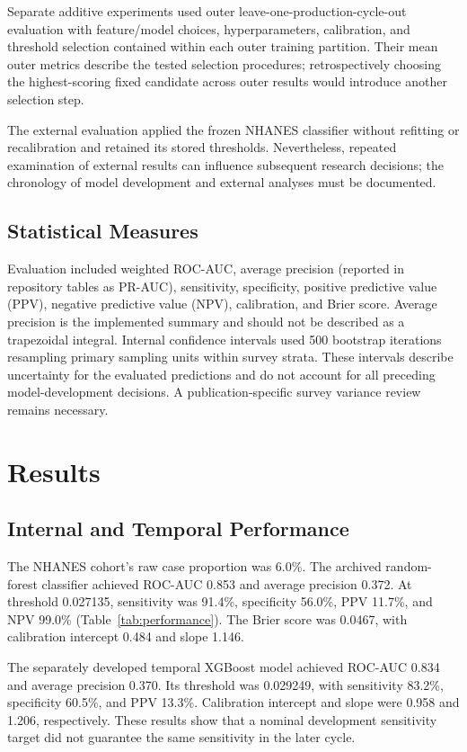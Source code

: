 \documentclass[11pt,a4paper]{article}
\begin{document}
Separate additive experiments used outer leave-one-production-cycle-out evaluation with feature/model choices, hyperparameters, calibration, and threshold selection contained within each outer training partition. Their mean outer metrics describe the tested selection procedures; retrospectively choosing the highest-scoring fixed candidate across outer results would introduce another selection step.

The external evaluation applied the frozen NHANES classifier without refitting or recalibration and retained its stored thresholds. Nevertheless, repeated examination of external results can influence subsequent research decisions; the chronology of model development and external analyses must be documented.

\subsection{Statistical Measures}
Evaluation included weighted ROC-AUC, average precision (reported in repository tables as PR-AUC), sensitivity, specificity, positive predictive value (PPV), negative predictive value (NPV), calibration, and Brier score. Average precision is the implemented summary and should not be described as a trapezoidal integral. Internal confidence intervals used 500 bootstrap iterations resampling primary sampling units within survey strata. These intervals describe uncertainty for the evaluated predictions and do not account for all preceding model-development decisions. A publication-specific survey variance review remains necessary.

\section{Results}
\subsection{Internal and Temporal Performance}
The NHANES cohort's raw case proportion was 6.0\%. The archived random-forest classifier achieved ROC-AUC 0.853 and average precision 0.372. At threshold 0.027135, sensitivity was 91.4\%, specificity 56.0\%, PPV 11.7\%, and NPV 99.0\% (Table~\ref{tab:performance}). The Brier score was 0.0467, with calibration intercept 0.484 and slope 1.146.

The separately developed temporal XGBoost model achieved ROC-AUC 0.834 and average precision 0.370. Its threshold was 0.029249, with sensitivity 83.2\%, specificity 60.5\%, and PPV 13.3\%. Calibration intercept and slope were 0.958 and 1.206, respectively. These results show that a nominal development sensitivity target did not guarantee the same sensitivity in the later cycle.
\end{document}
